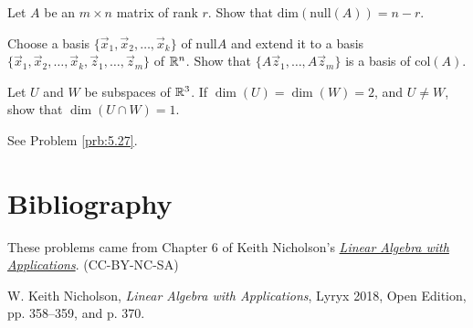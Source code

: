 \documentclass{ximera}
\begin{document}
\begin{problem}\label{prob:nich6.5}
    Let $A$ be an $m\times n$ matrix of rank $r$.  Show that $\text{dim}(\text{null}(A))=n-r$.
    \begin{hint}
        Choose a basis $\{\vec{x}_1, \vec{x}_2, \dots, \vec{x}_k\}$ of $\text{null}A$ and extend it to a basis $\{\vec{x}_1, \vec{x}_2, \dots, \vec{x}_k, \vec{z}_1, \dots , \vec{z}_m\}$ of $\mathbb{R}^n$.  Show that $\{A\vec{z}_1, \dots , A\vec{z}_m\}$ is a basis of $\text{col}(A)$.
    \end{hint}
\end{problem}

\begin{problem}\label{prob:nich6.4.18}
    Let $U$ and $W$ be subspaces of $\mathbb{R}^3$.  If $\dim (U)=\dim (W)=2$, and $U\neq W$, show that $\dim (U\cap W)=1$.
    \begin{hint}
        See Problem \ref{prb:5.27}.
    \end{hint}
\end{problem}



\section*{Bibliography}
These problems came from Chapter 6 of Keith Nicholson's \href{https://open.umn.edu/opentextbooks/textbooks/linear-algebra-with-applications}{\it Linear Algebra with Applications}. (CC-BY-NC-SA)

W. Keith Nicholson, {\it Linear Algebra with Applications}, Lyryx 2018, Open Edition, pp. 358--359, and p. 370.
\end{document}
